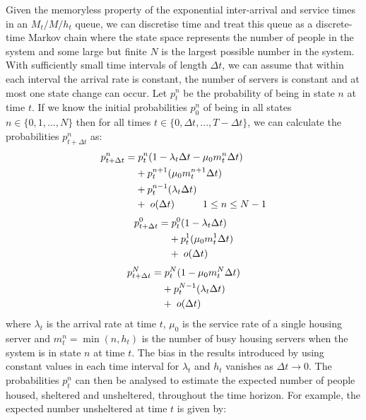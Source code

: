 \documentclass[12pt,a4paper]{article}
\begin{document}
Given the memoryless property of the exponential inter-arrival and service times in an $M_t/M/h_t$ queue, we can discretise time and treat this queue as a discrete-time Markov chain where the state space represents the number of people in the system and some large but finite $N$ is the largest possible number in the system. With sufficiently small time intervals of length $\Delta t$, we can assume that within each interval the arrival rate is constant, the number of servers is constant and at most one state change can occur. Let $p^{n}_{t}$ be the probability of being in state $n$ at time $t$. If we know the initial probabilities $p^{n}_{0}$ of being in all states $n \in \{0,1,...,N\}$ then for all times $t \in \{0, \Delta t,...,T-\Delta t\}$, we can calculate the probabilities $p^{n}_{t + \Delta t}$ as: 
% 
\begin{align*}
  p^n_{t+\Delta t} = & \hspace{0.1cm} p^{n}_{t}(1-\lambda_t\Delta t-\mu_0 m^n_t \Delta t) \\
                    & + p^{n+1}_{t}(\mu_0 m^{n+1}_t \Delta t) \\
                    & + p^{n-1}_t(\lambda_t \Delta t) \\
                    & + \hspace{0.1cm} o(\Delta t) \hspace{1cm} 1 \leq n \leq N-1
\end{align*}
% 
\begin{align*}
  p^0_{t+\Delta t} = & \hspace{0.1cm} p^{0}_{t}(1-\lambda_t\Delta t) \\
                    & + p^{1}_t(\mu_0 m^{1}_t \Delta t) \\
                    & + \hspace{0.1cm} o(\Delta t)
\end{align*}
% 
\begin{align*}
  p^N_{t+\Delta t} = & \hspace{0.1cm} p^{N}_{t}(1-\mu_0 m^N_t \Delta t) \\
                    & + p^{N-1}_t(\lambda_t \Delta t) \\
                    & + \hspace{0.1cm} o(\Delta t)
\end{align*}
% 
where $\lambda_t$ is the arrival rate at time $t$, $\mu_0$ is the service rate of a single housing server and $m^n_t = \min(n,h_t)$ is the number of busy housing servers when the system is in state $n$ at time $t$. The bias in the results introduced by using constant values in each time interval for $\lambda_t$ and $h_t$ vanishes as $\Delta t \to 0$. The probabilities $p^n_t$ can then be analysed to estimate the expected number of people housed, sheltered and unsheltered, throughout the time horizon. For example, the expected number unsheltered at time $t$ is given by:
\end{document}
